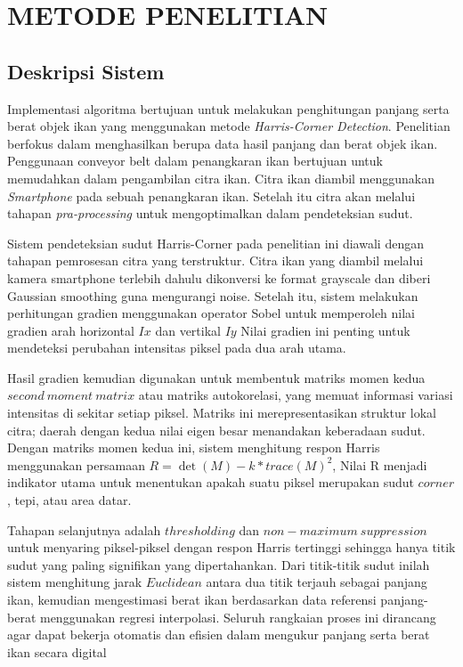 
\chapter{METODE PENELITIAN}

\section{Deskripsi Sistem}
    Implementasi algoritma bertujuan untuk melakukan penghitungan panjang serta berat objek ikan yang menggunakan
metode \emph{Harris-Corner Detection}. Penelitian berfokus dalam menghasilkan berupa data hasil panjang dan berat objek ikan. Penggunaan conveyor belt dalam penangkaran ikan bertujuan untuk memudahkan dalam pengambilan citra ikan. Citra ikan diambil menggunakan \emph{Smartphone} pada sebuah penangkaran ikan.
Setelah itu citra akan melalui tahapan \emph{pra-processing} untuk mengoptimalkan dalam pendeteksian sudut.

Sistem pendeteksian sudut Harris-Corner pada penelitian ini diawali dengan tahapan pemrosesan citra yang terstruktur. Citra ikan yang diambil melalui kamera smartphone terlebih dahulu dikonversi ke format grayscale dan diberi Gaussian smoothing guna mengurangi noise. Setelah itu, sistem melakukan perhitungan gradien menggunakan operator Sobel untuk memperoleh nilai gradien arah horizontal \(Ix\) dan vertikal \(Iy\) Nilai gradien ini penting untuk mendeteksi perubahan intensitas piksel pada dua arah utama.

Hasil gradien kemudian digunakan untuk membentuk matriks momen kedua \(second~moment~matrix\) atau matriks autokorelasi, yang memuat informasi variasi intensitas di sekitar setiap piksel. Matriks ini merepresentasikan struktur lokal citra; daerah dengan kedua nilai eigen besar menandakan keberadaan sudut. Dengan matriks momen kedua ini, sistem menghitung respon Harris menggunakan persamaan \(R = \det(M) - k * {trace(M)}^2\), Nilai R menjadi indikator utama untuk menentukan apakah suatu piksel merupakan sudut \(corner\), tepi, atau area datar.

Tahapan selanjutnya adalah \(thresholding\) dan \(non-maximum~suppression\) untuk menyaring piksel-piksel dengan respon Harris tertinggi sehingga hanya titik sudut yang paling signifikan yang dipertahankan. Dari titik-titik sudut inilah sistem menghitung jarak \(Euclidean\) antara dua titik terjauh sebagai panjang ikan, kemudian mengestimasi berat ikan berdasarkan data referensi panjang-berat menggunakan regresi interpolasi. Seluruh rangkaian proses ini dirancang agar dapat bekerja otomatis dan efisien dalam mengukur panjang serta berat ikan secara digital

